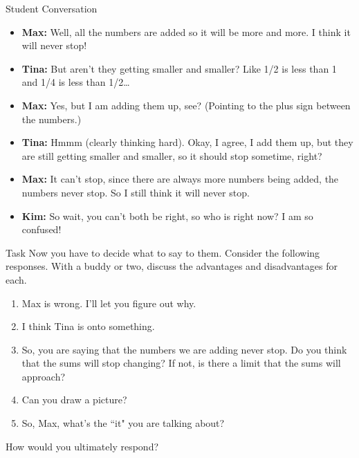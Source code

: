 \documentclass[10pt,handout]{beamer}
\begin{document}

\begin{frame}

\begin{block}{Student Conversation}
\begin{itemize}
\item[] \textbf{Max:} Well, all the numbers are added so it will be more and more. I think it will never stop!
\item[] \textbf{Tina:} But aren't they getting smaller and smaller? Like 1/2 is less than 1 and 1/4 is less than 1/2\ldots
\item[] \textbf{Max:} Yes, but I am adding them up, see? (Pointing to the plus sign between the numbers.)
\item[] \textbf{Tina:} Hmmm (clearly thinking hard). Okay, I agree, I add them up, but they are still getting smaller and smaller, so it should stop sometime, right?
\item[] \textbf{Max:} It can't stop, since there are always more numbers being added, the numbers never stop. So I still think it will never stop.
\item[] \textbf{Kim:} So wait, you can't both be right, so who is right now? I am so confused!
\end{itemize}
\end{block}

\end{frame}


\begin{frame}

\begin{block}{Task}
Now you have to decide what to say to them.  Consider the following responses.  With a buddy or two, discuss the advantages and disadvantages for each.

\begin{enumerate}
\item Max is wrong.  I'll let you figure out why.
\item I think Tina is onto something.
\item So, you are saying that the numbers we are adding never stop.  Do you think that the sums will stop changing?  If not, is there a limit that the sums will approach?
\item Can you draw a picture?
\item So, Max, what's the ``it" you are talking about?
\end{enumerate}

How would you ultimately respond?
\end{block}

\end{frame}

\end{document}

